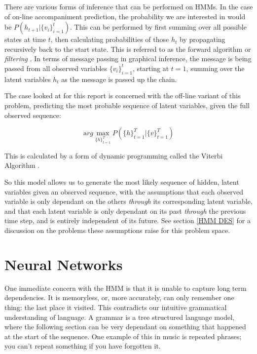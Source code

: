 \documentclass[bsc,singlespacing,logo, parskip, deptreport]{infthesis}
\begin{document}
There are various forms of inference that can be performed on HMMs. In the case of on-line accompaniment prediction, the probability we are interested in would be $P(h_{t+1} | \{v_i\}_{i=1}^{t})$. This can be performed by first summing over all possible states at time $t$, then calculating probabilities of those $h_t$ by propagating recursively back to the start state. This is referred to as the forward algorithm or {\em filtering} \cite{russell2002artificial}. In terms of message passing in graphical inference, the message is being passed from all observed variables $\{v_i\}_{i=1}^{t}$, starting at $t=1$, summing over the latent variables $h_t$ as the message is passed up the chain.

The case looked at for this report is concerned with the off-line variant of this problem, predicting the most probable sequence of latent variables, given the full observed sequence:

\begin{equation}
  {\mathrm arg}\max_{\{h\}_{t=1}^{T}} P(\{h\}_{t=1}^{T} | \{v\}_{t=1}^{T})
\end{equation}

This is calculated by a form of dynamic programming called the Viterbi Algorithm \cite{russell2002artificial}.

So this model allows us to generate the most likely sequence of hidden, latent variables given an observed sequence, with the assumptions that each observed variable is only dependant on the others {\em through} its corresponding latent variable, and that each latent variable is only dependant on its past {\em through} the previous time step, and is entirely independent of its future. See section \ref{HMM DES} for a discussion on the problems these assumptions raise for this problem space.

\section{Neural Networks}

One immediate concern with the HMM is that it is unable to capture long term dependencies. It is memoryless, or, more accurately, can only remember one thing: the last place it visited. This contradicts our intuitive grammatical understanding of language. A grammar is a tree structured language model, where the following section can be very dependant on something that happened at the start of the sequence. One example of this in music is repeated phrases; you can't repeat something if you have forgotten it.
\end{document}

